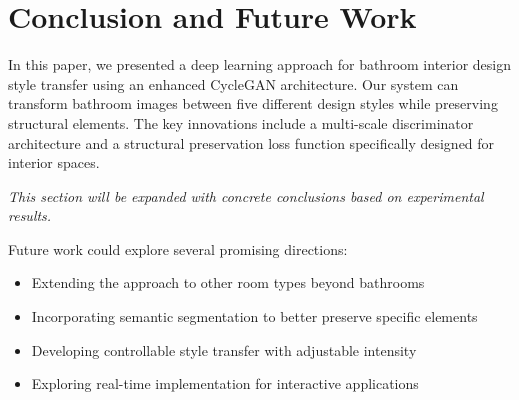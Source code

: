 \documentclass[twocolumn,superscriptaddress,aps]{revtex4-1}
\begin{document}
\section{Conclusion and Future Work}

In this paper, we presented a deep learning approach for bathroom interior design style transfer using an enhanced CycleGAN architecture. Our system can transform bathroom images between five different design styles while preserving structural elements. The key innovations include a multi-scale discriminator architecture and a structural preservation loss function specifically designed for interior spaces.

\textit{This section will be expanded with concrete conclusions based on experimental results.}

Future work could explore several promising directions:

\begin{itemize}
    \item Extending the approach to other room types beyond bathrooms
    \item Incorporating semantic segmentation to better preserve specific elements
    \item Developing controllable style transfer with adjustable intensity
    \item Exploring real-time implementation for interactive applications
\end{itemize}





\end{document}

